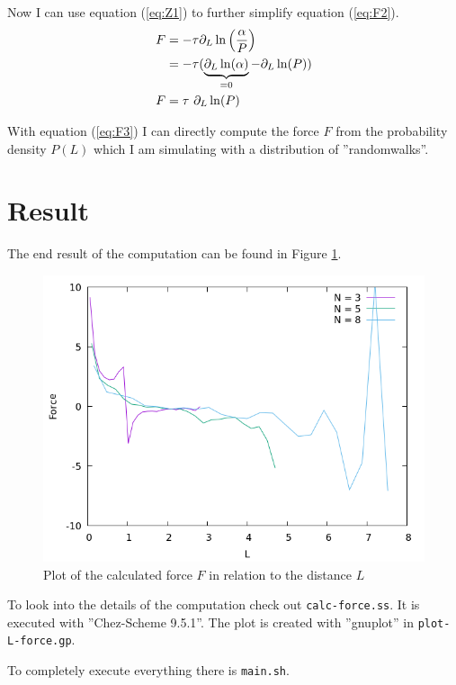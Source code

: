 \documentclass[a4paper,12pt]{scrartcl}
\begin{document}
Now I can use equation (\ref{eq:Z1}) to further simplify equation (\ref{eq:F2}).
\begin{align}
	F &= - \tau \partial_L \ln \left( \frac{\alpha}{P} \right) \notag \\
	&= - \tau ( \underbrace{\partial_L \ln(\alpha)}_{= 0} - \partial_L \ln(P) ) \notag \\
	F &= \tau \text{ } \partial_L \ln(P) \label{eq:F3}
\end{align}

With equation (\ref{eq:F3}) I can directly compute the force $F$ from the probability density $P(L)$ which I am simulating with a distribution of ''randomwalks''.

\section{Result}
The end result of the computation can be found in Figure \ref{fig:1}.

\begin{figure}[ht]
	\centering
	\includegraphics[scale=0.65]{../out/plot-L-force.png}
	\caption{Plot of the calculated force $F$ in relation to the distance $L$}
	\label{fig:1}
\end{figure}

To look into the details of the computation check out \texttt{calc-force.ss}. It is executed with ''Chez-Scheme 9.5.1''.
The plot is created with ''gnuplot'' in \texttt{plot-L-force.gp}.

To completely execute everything there is \texttt{main.sh}.
\end{document}
